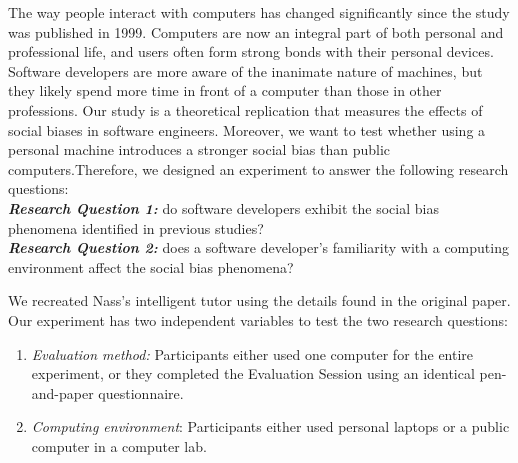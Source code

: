 \documentclass{sig-alternate-05-2015}
\begin{document}
The way people interact with computers has changed significantly since the study was published  in 1999.  Computers are now an integral part of both personal and professional life, and users often form strong bonds with their personal devices.  Software developers are more aware of the inanimate nature of machines, but they likely spend more time in front of a computer than those in other professions. Our study is a theoretical replication that measures the effects of social biases in software engineers.  Moreover, we want to test whether using a personal machine introduces a stronger social bias than public computers.Therefore, we designed an experiment to answer the following research questions:\\

\noindent \textbf{\emph{Research Question 1:}} do software developers exhibit the social bias phenomena identified in previous studies?\\

\noindent \textbf{\emph{Research Question 2:}} does a software developer's familiarity with a computing environment affect the social bias phenomena?\\

We recreated Nass's intelligent tutor using the details found in the original paper. Our experiment has two independent variables to test the two research questions:
\begin{enumerate}
    \item{\emph{Evaluation method:} Participants either used one computer for the entire experiment, or they completed the Evaluation Session using an identical pen-and-paper questionnaire.}
    \item {\textit{Computing environment}: Participants either used personal laptops or a public computer in a computer lab.}
\end{enumerate}

\end{document}
